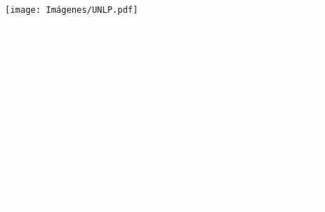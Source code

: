 \pagecolor{UNLPVerde}\afterpage{\nopagecolor}

\texttt{[image: Imágenes/UNLP.pdf]}

\vspace*{1cm}

\fontsize{70}{75}\selectfont \textcolor{white}{\textbf{Proyecto}}

\fontsize{70}{75}\selectfont \textcolor{white}{\textbf{Final}}


\vspace{10mm}

\Large\textcolor{white}{\textbf{Sistemas Híbridos de Almacenamiento No Convencionales }}
\par
\Large\textcolor{white}{\textbf{Orientados a Aplicaciones Móviles}}
\vspace{110mm}

\normalsize
\textcolor{white}{\emph{Alex Benjamín Gubkien}}

\medskip

\textcolor{white}{\emph{Director: Jerónimo José Moré}}

\medskip

\textcolor{white}{\emph{Co-Director: Paul Puleston}}

\medskip

\textcolor{white}{\emph{Instituto LEICI, Departamento de Electrotecnia, Facultad de Ingeniería}}



\thispagestyle{empty}


\restoregeometry   
\newpage